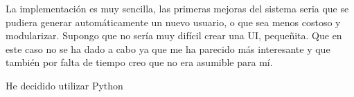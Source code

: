 \documentclass{uimppracticas}
\begin{document}
La implementación es muy sencilla, las primeras mejoras del sistema seria que se pudiera generar automáticamente un nuevo usuario, o que sea menos costoso y modularizar. Supongo que no sería muy difícil crear una UI, pequeñita. Que en este caso no se ha dado a cabo ya que me ha parecido más interesante y que también por falta de tiempo creo que no era asumible para mí.

He decidido utilizar Python

\renewcommand{\refname}{Bibliografía}


	
\end{document}

